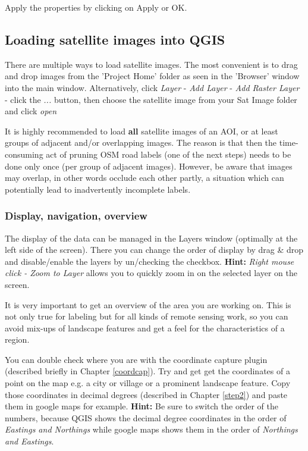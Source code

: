 \documentclass[12pt,a4paper]{scrartcl}
\begin{document}
Apply the properties by clicking on Apply or OK.


\subsection{Loading satellite images into QGIS}
\label{step3}
There are multiple ways to load satellite images. The most convenient is to drag and drop images from the 'Project Home' folder as seen in the 'Browser' window into the main window. Alternatively, click \textit{Layer} - \textit{Add Layer} - \textit{Add Raster Layer} - click the \textit{...} button, then choose the satellite image from your Sat Image folder and click \textit{open}

It is highly recommended to load \textbf{all} satellite images of an AOI, or at least groups of adjacent and/or overlapping images. The reason is that then the time-consuming act of pruning OSM road labels (one of the next steps) needs to be done only once (per group of adjacent images). However, be aware that images may overlap, in other words occlude each other partly, a situation which can potentially lead to inadvertently incomplete labels.


\subsubsection{Display, navigation, overview}
The display of the data can be managed in the Layers window (optimally at the left side of the screen). There you can change the order of display by drag \& drop and disable/enable the layers by un/checking the checkbox. \textbf{Hint:} \textit{Right mouse click - Zoom to Layer} allows you to quickly zoom in on the selected layer on the screen.

It is very important to get an overview of the area you are working on. This is not only true for labeling but for all kinds of remote sensing work, so you can avoid mix-ups of landscape features and get a feel for the characteristics of a region.  

You can double check where you are with the coordinate capture plugin (described briefly in Chapter \ref{coordcap}).
Try and get get the coordinates of a point on the map e.g. a city or village or a prominent landscape feature. 
Copy those coordinates in decimal degrees (described in Chapter \ref{step2}) and paste them in google maps for example. \textbf{Hint:} Be sure to switch the order of the numbers, because QGIS shows the decimal degree coordinates in the order of \textit{Eastings and Northings} while google maps shows them in the order of \textit{Northings and Eastings}.
\end{document}
